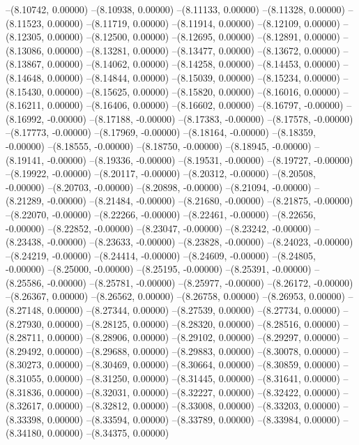 --(8.10742, 0.00000)
--(8.10938, 0.00000)
--(8.11133, 0.00000)
--(8.11328, 0.00000)
--(8.11523, 0.00000)
--(8.11719, 0.00000)
--(8.11914, 0.00000)
--(8.12109, 0.00000)
--(8.12305, 0.00000)
--(8.12500, 0.00000)
--(8.12695, 0.00000)
--(8.12891, 0.00000)
--(8.13086, 0.00000)
--(8.13281, 0.00000)
--(8.13477, 0.00000)
--(8.13672, 0.00000)
--(8.13867, 0.00000)
--(8.14062, 0.00000)
--(8.14258, 0.00000)
--(8.14453, 0.00000)
--(8.14648, 0.00000)
--(8.14844, 0.00000)
--(8.15039, 0.00000)
--(8.15234, 0.00000)
--(8.15430, 0.00000)
--(8.15625, 0.00000)
--(8.15820, 0.00000)
--(8.16016, 0.00000)
--(8.16211, 0.00000)
--(8.16406, 0.00000)
--(8.16602, 0.00000)
--(8.16797, -0.00000)
--(8.16992, -0.00000)
--(8.17188, -0.00000)
--(8.17383, -0.00000)
--(8.17578, -0.00000)
--(8.17773, -0.00000)
--(8.17969, -0.00000)
--(8.18164, -0.00000)
--(8.18359, -0.00000)
--(8.18555, -0.00000)
--(8.18750, -0.00000)
--(8.18945, -0.00000)
--(8.19141, -0.00000)
--(8.19336, -0.00000)
--(8.19531, -0.00000)
--(8.19727, -0.00000)
--(8.19922, -0.00000)
--(8.20117, -0.00000)
--(8.20312, -0.00000)
--(8.20508, -0.00000)
--(8.20703, -0.00000)
--(8.20898, -0.00000)
--(8.21094, -0.00000)
--(8.21289, -0.00000)
--(8.21484, -0.00000)
--(8.21680, -0.00000)
--(8.21875, -0.00000)
--(8.22070, -0.00000)
--(8.22266, -0.00000)
--(8.22461, -0.00000)
--(8.22656, -0.00000)
--(8.22852, -0.00000)
--(8.23047, -0.00000)
--(8.23242, -0.00000)
--(8.23438, -0.00000)
--(8.23633, -0.00000)
--(8.23828, -0.00000)
--(8.24023, -0.00000)
--(8.24219, -0.00000)
--(8.24414, -0.00000)
--(8.24609, -0.00000)
--(8.24805, -0.00000)
--(8.25000, -0.00000)
--(8.25195, -0.00000)
--(8.25391, -0.00000)
--(8.25586, -0.00000)
--(8.25781, -0.00000)
--(8.25977, -0.00000)
--(8.26172, -0.00000)
--(8.26367, 0.00000)
--(8.26562, 0.00000)
--(8.26758, 0.00000)
--(8.26953, 0.00000)
--(8.27148, 0.00000)
--(8.27344, 0.00000)
--(8.27539, 0.00000)
--(8.27734, 0.00000)
--(8.27930, 0.00000)
--(8.28125, 0.00000)
--(8.28320, 0.00000)
--(8.28516, 0.00000)
--(8.28711, 0.00000)
--(8.28906, 0.00000)
--(8.29102, 0.00000)
--(8.29297, 0.00000)
--(8.29492, 0.00000)
--(8.29688, 0.00000)
--(8.29883, 0.00000)
--(8.30078, 0.00000)
--(8.30273, 0.00000)
--(8.30469, 0.00000)
--(8.30664, 0.00000)
--(8.30859, 0.00000)
--(8.31055, 0.00000)
--(8.31250, 0.00000)
--(8.31445, 0.00000)
--(8.31641, 0.00000)
--(8.31836, 0.00000)
--(8.32031, 0.00000)
--(8.32227, 0.00000)
--(8.32422, 0.00000)
--(8.32617, 0.00000)
--(8.32812, 0.00000)
--(8.33008, 0.00000)
--(8.33203, 0.00000)
--(8.33398, 0.00000)
--(8.33594, 0.00000)
--(8.33789, 0.00000)
--(8.33984, 0.00000)
--(8.34180, 0.00000)
--(8.34375, 0.00000)
